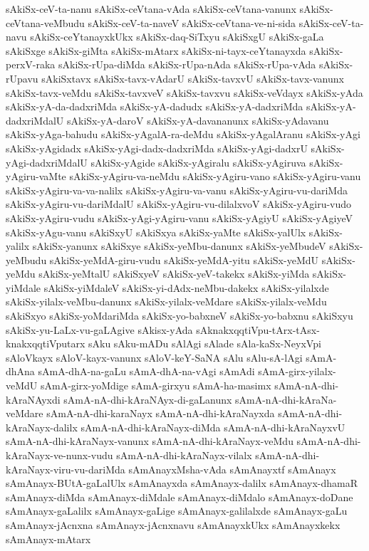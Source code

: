 {sAkiSx-ceV-ta-nanu
sAkiSx-ceVtana-vAda
sAkiSx-ceVtana-vanunx
sAkiSx-ceVtana-veMbudu
sAkiSx-ceV-ta-naveV
sAkiSx-ceVtana-ve-ni-sida
sAkiSx-ceV-ta-navu
sAkiSx-ceYtanayxkUkx
sAkiSx-daq-SiTxyu
sAkiSxgU
sAkiSx-gaLa
sAkiSxge
sAkiSx-giMta
sAkiSx-mAtarx
sAkiSx-ni-tayx-ceYtanayxda
sAkiSx-perxV-raka
sAkiSx-rUpa-diMda
sAkiSx-rUpa-nAda
sAkiSx-rUpa-vAda
sAkiSx-rUpavu
sAkiSxtavx
sAkiSx-tavx-vAdarU
sAkiSx-tavxvU
sAkiSx-tavx-vanunx
sAkiSx-tavx-veMdu
sAkiSx-tavxveV
sAkiSx-tavxvu
sAkiSx-veVdayx
sAkiSx-yAda
sAkiSx-yA-da-dadxriMda
sAkiSx-yA-dadudx
sAkiSx-yA-dadxriMda
sAkiSx-yA-dadxriMdalU
sAkiSx-yA-daroV
sAkiSx-yA-davananunx
sAkiSx-yAdavanu
sAkiSx-yAga-bahudu
sAkiSx-yAgalA-ra-deMdu
sAkiSx-yAgalAranu
sAkiSx-yAgi
sAkiSx-yAgidadx
sAkiSx-yAgi-dadx-dadxriMda
sAkiSx-yAgi-dadxrU
sAkiSx-yAgi-dadxriMdalU
sAkiSx-yAgide
sAkiSx-yAgiralu
sAkiSx-yAgiruva
sAkiSx-yAgiru-vaMte
sAkiSx-yAgiru-va-neMdu
sAkiSx-yAgiru-vano
sAkiSx-yAgiru-vanu
sAkiSx-yAgiru-va-va-nalilx
sAkiSx-yAgiru-va-vanu
sAkiSx-yAgiru-vu-dariMda
sAkiSx-yAgiru-vu-dariMdalU
sAkiSx-yAgiru-vu-dilalxvoV
sAkiSx-yAgiru-vudo
sAkiSx-yAgiru-vudu
sAkiSx-yAgi-yAgiru-vanu
sAkiSx-yAgiyU
sAkiSx-yAgiyeV
sAkiSx-yAgu-vanu
sAkiSxyU
sAkiSxya
sAkiSx-yaMte
sAkiSx-yalUlx
sAkiSx-yalilx
sAkiSx-yanunx
sAkiSxye
sAkiSx-yeMbu-danunx
sAkiSx-yeMbudeV
sAkiSx-yeMbudu
sAkiSx-yeMdA-giru-vudu
sAkiSx-yeMdA-yitu
sAkiSx-yeMdU
sAkiSx-yeMdu
sAkiSx-yeMtalU
sAkiSxyeV
sAkiSx-yeV-takekx
sAkiSx-yiMda
sAkiSx-yiMdale
sAkiSx-yiMdaleV
sAkiSx-yi-dAdx-neMbu-dakekx
sAkiSx-yilalxde
sAkiSx-yilalx-veMbu-danunx
sAkiSx-yilalx-veMdare
sAkiSx-yilalx-veMdu
sAkiSxyo
sAkiSx-yoMdariMda
sAkiSx-yo-babxneV
sAkiSx-yo-babxnu
sAkiSxyu
sAkiSx-yu-LaLx-vu-gaLAgive
sAkisx-yAda
sAknakxqqtiVpu-tArx-tAsx-knakxqqtiVputarx
sAku
sAku-mADu
sAlAgi
sAlade
sAla-kaSx-NeyxVpi
sAloVkayx
sAloV-kayx-vanunx
sAloV-keY-SaNA
sAlu
sAlu-sA-lAgi
sAmA-dhAna
sAmA-dhA-na-gaLu
sAmA-dhA-na-vAgi
sAmAdi
sAmA-girx-yilalx-veMdU
sAmA-girx-yoMdige
sAmA-girxyu
sAmA-ha-masimx
sAmA-nA-dhi-kAraNAyxdi
sAmA-nA-dhi-kAraNAyx-di-gaLanunx
sAmA-nA-dhi-kAraNa-veMdare
sAmA-nA-dhi-karaNayx
sAmA-nA-dhi-kAraNayxda
sAmA-nA-dhi-kAraNayx-dalilx
sAmA-nA-dhi-kAraNayx-diMda
sAmA-nA-dhi-kAraNayxvU
sAmA-nA-dhi-kAraNayx-vanunx
sAmA-nA-dhi-kAraNayx-veMdu
sAmA-nA-dhi-kAraNayx-ve-nunx-vudu
sAmA-nA-dhi-kAraNayx-vilalx
sAmA-nA-dhi-kAraNayx-viru-vu-dariMda
sAmAnayxMsha-vAda
sAmAnayxtf
sAmAnayx
sAmAnayx-BUtA-gaLalUlx
sAmAnayxda
sAmAnayx-dalilx
sAmAnayx-dhamaR
sAmAnayx-diMda
sAmAnayx-diMdale
sAmAnayx-diMdalo
sAmAnayx-doDane
sAmAnayx-gaLalilx
sAmAnayx-gaLige
sAmAnayx-galilalxde
sAmAnayx-gaLu
sAmAnayx-jAcnxna
sAmAnayx-jAcnxnavu
sAmAnayxkUkx
sAmAnayxkekx
sAmAnayx-mAtarx
}
